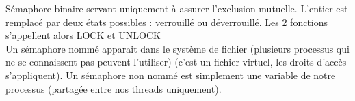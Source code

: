  Sémaphore binaire servant uniquement à assurer l'exclusion mutuelle. L'entier est remplacé par deux états possibles : verrouillé ou déverrouillé. Les 2 fonctions s'appellent alors LOCK et UNLOCK \\

 Un sémaphore nommé apparait dans le système de fichier (plusieurs processus qui ne se connaissent pas peuvent l'utiliser) (c'est un fichier virtuel, les droits d'accès s'appliquent).  Un sémaphore non nommé est simplement une variable de notre processus (partagée entre nos threads uniquement).

